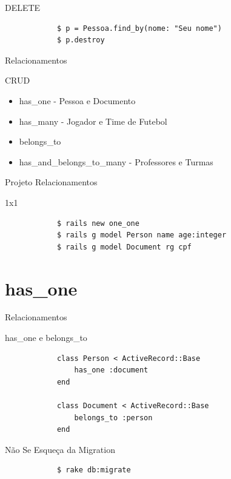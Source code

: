 \documentclass{beamer}
\begin{document}
\begin{frame}[fragile]{DELETE }
	\begin{block}{}
			\begin{verbatim}
			$ p = Pessoa.find_by(nome: "Seu nome")
			$ p.destroy
			\end{verbatim}
			\end{block}
\end{frame}

\begin{frame}{Relacionamentos}
	\begin{block} {\LARGE CRUD}
		\begin{itemize} \itemsep 2em
			\item{\LARGE has\_one - Pessoa e Documento}
			\item{\LARGE has\_many - Jogador e Time de Futebol}
			\item{\LARGE belongs\_to}
			\item{\LARGE has\_and\_belongs\_to\_many - Professores e Turmas}				
		\end{itemize}
	\end{block}
\end{frame}

\begin{frame}[fragile]{Projeto Relacionamentos}
	\begin{block} {1x1}
		\begin{verbatim}
		  	$ rails new one_one
		  	$ rails g model Person name age:integer
		  	$ rails g model Document rg cpf
		\end{verbatim}
	\end{block}
\end{frame}
\section{has\_one}
\begin{frame}[fragile]{Relacionamentos}
	\begin{block} {\LARGE has\_one e belongs\_to}
		\begin{verbatim}
		  	class Person < ActiveRecord::Base
		  	    has_one :document
		  	end
		  	
		  	class Document < ActiveRecord::Base
		  	    belongs_to :person
		  	end
		\end{verbatim}
	\end{block}
\end{frame}

\begin{frame}[fragile]{Não Se Esqueça da Migration}
	\begin{block} {
	}
		\begin{verbatim}
		  	$ rake db:migrate
		\end{verbatim}
	\end{block}
\end{frame}
\end{document}
